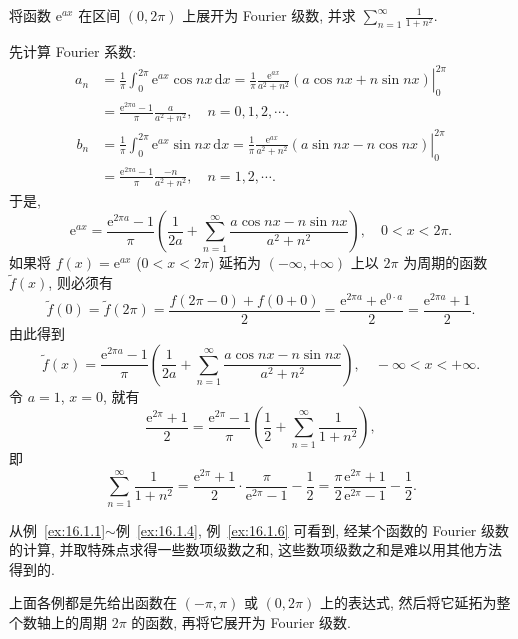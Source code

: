 \begin{example}\label{ex:16.1.6}
将函数 $\mathrm{e}^{ax}$ 在区间 $(0,2\pi)$ 上展开为 Fourier 级数, 并求 $\displaystyle\sum_{n=1}^{\infty}\frac{1}{1+n^{2}}$.
\end{example}

\begin{solution}
先计算 Fourier 系数:
\[
  \begin{aligned}
    a_{n}&=\frac{1}{\pi}\int_{0}^{2\pi}\mathrm{e}^{ax}\cos nx\,\mathrm{d}x=\left.\frac{1}{\pi}\frac{\mathrm{e}^{ax}}{a^{2}+n^{2}}(a\cos nx+n\sin nx)\right|_{0}^{2\pi}\\
    &=\frac{\mathrm{e}^{2\pi a}-1}{\pi}\frac{a}{a^{2}+n^{2}},\quad n=0,1,2,\cdots.
  \end{aligned}
\]
\[
  \begin{aligned}
    b_{n}&=\frac{1}{\pi}\int_{0}^{2\pi}\mathrm{e}^{ax}\sin nx\,\mathrm{d}x=\left.\frac{1}{\pi}\frac{\mathrm{e}^{ax}}{a^{2}+n^{2}}(a\sin nx-n\cos nx)\right|_{0}^{2\pi}\\
    &=\frac{\mathrm{e}^{2\pi a}-1}{\pi}\frac{-n}{a^{2}+n^{2}},\quad n=1,2,\cdots.
  \end{aligned}
\]
于是,
\[
  \mathrm{e}^{ax}=\frac{\mathrm{e}^{2\pi a}-1}{\pi}\left(\frac{1}{2a}+\sum_{n=1}^{\infty}\frac{a\cos nx-n\sin nx}{a^{2}+n^{2}}\right),\quad 0<x<2\pi.
\]
如果将 $f(x)=\mathrm{e}^{ax}$ ($0<x<2\pi$) 延拓为 $(-\infty,+\infty)$ 上以 $2\pi$ 为周期的函数 $\tilde{f}(x)$, 则必须有
\[
  \tilde{f}(0)=\tilde{f}(2\pi)=\frac{f(2\pi-0)+f(0+0)}{2}=\frac{\mathrm{e}^{2\pi a}+\mathrm{e}^{0\cdot a}}{2}=\frac{\mathrm{e}^{2\pi a}+1}{2}.
\]
由此得到
\[
  \tilde{f}(x)=\frac{\mathrm{e}^{2\pi a}-1}{\pi}\left(\frac{1}{2a}+\sum_{n=1}^{\infty}\frac{a\cos nx-n\sin nx}{a^{2}+n^{2}}\right),\quad -\infty<x<+\infty.
\]
令 $a=1$, $x=0$, 就有
\[
  \frac{\mathrm{e}^{2\pi}+1}{2}=\frac{\mathrm{e}^{2\pi}-1}{\pi}\left(\frac{1}{2}+\sum_{n=1}^{\infty}\frac{1}{1+n^{2}}\right),
\]
即
\[
  \sum_{n=1}^{\infty}\frac{1}{1+n^{2}}=\frac{\mathrm{e}^{2\pi}+1}{2}\cdot\frac{\pi}{\mathrm{e}^{2\pi}-1}-\frac{1}{2}=\frac{\pi}{2}\frac{\mathrm{e}^{2\pi}+1}{\mathrm{e}^{2\pi}-1}-\frac{1}{2}.
\]
\end{solution}

\begin{remark}\label{rem:16.1.2}
从例~\ref{ex:16.1.1}$\sim$例~\ref{ex:16.1.4}, 例~\ref{ex:16.1.6} 可看到, 经某个函数的 Fourier 级数的计算, 并取特殊点求得一些数项级数之和, 这些数项级数之和是难以用其他方法得到的.
\end{remark}

上面各例都是先给出函数在 $(-\pi,\pi)$ 或 $(0,2\pi)$ 上的表达式, 然后将它延拓为整个数轴上的周期 $2\pi$ 的函数, 再将它展开为 Fourier 级数.

